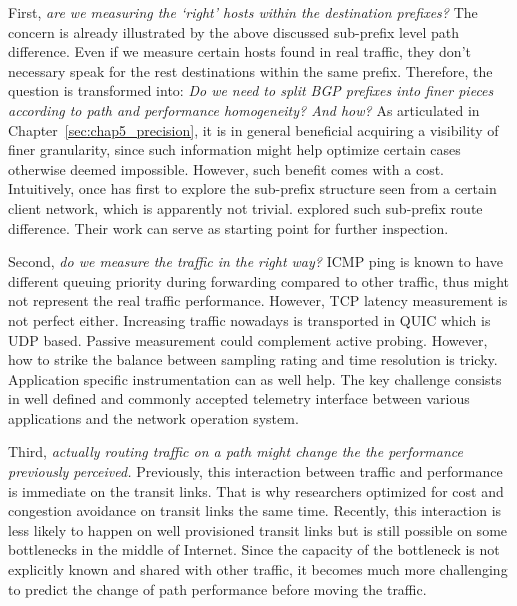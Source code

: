First, \textit{are we measuring the `right' hosts within the destination prefixes?} The concern is already illustrated by the above discussed sub-prefix level path difference. Even if we measure certain hosts found in real traffic, they don't necessary speak for the rest destinations within the same prefix.
Therefore, the question is transformed into: \textit{Do we need to split BGP prefixes into finer pieces according to path and performance homogeneity? And how?}
As articulated in Chapter~\ref{sec:chap5_precision}, it is in general beneficial acquiring a visibility of finer granularity, since such information might help optimize certain cases otherwise deemed impossible.
However, such benefit comes with a cost. Intuitively, once has first to explore the sub-prefix structure seen from a certain client network, which is apparently not trivial.
\citet{Lee2016} explored such sub-prefix route difference. Their work can serve as starting point for further inspection.

Second, \textit{do we measure the traffic in the right way?} ICMP ping is known to have different queuing priority during forwarding compared to other traffic, thus might not represent the real traffic performance. However, TCP latency measurement is not perfect either. Increasing traffic nowadays is transported in QUIC which is UDP based.
Passive measurement could complement active probing. However, how to strike the balance between sampling rating and time resolution is tricky.
Application specific instrumentation can as well help. The key challenge consists in well defined and commonly accepted telemetry interface between various applications and the network operation system.

Third, \textit{actually routing traffic on a path might change the the performance previously perceived.} Previously, this interaction between traffic and performance is immediate on the transit links. That is why researchers optimized for cost and congestion avoidance on transit links the same time. Recently, this interaction is less likely to happen on well provisioned transit links but is still possible on some bottlenecks in the middle of Internet. Since the capacity of the bottleneck is not explicitly known and shared with other traffic, it becomes much more challenging to predict the change of path performance before moving the traffic.  

